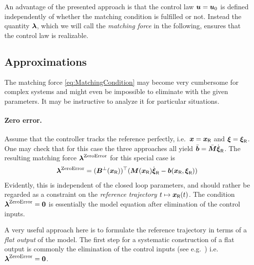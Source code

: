 An advantage of the presented approach is that the control law $\boldsymbol{u} = \boldsymbol{u}_0$ is defined independently of whether the matching condition is fulfilled or not.
Instead the quantity $\boldsymbol{\lambda}$, which we will call the \textit{matching force} in the following, ensures that the control law is realizable.

\subsection{Approximations}
The matching force \eqref{eq:MatchingCondition} may become very cumbersome for complex systems and might even be impossible to eliminate with the given parameters.
It may be instructive to analyze it for particular situations.

\paragraph{Zero error.}
Assume that the controller tracks the reference perfectly, i.e.\ $\boldsymbol{x} = \boldsymbol{x}_{\mathsf{R}}$ and $\boldsymbol{\xi}=\boldsymbol{\xi}_{\mathsf{R}}$.
One may check that for this case the three approaches all yield $\bar{\boldsymbol{b}} = \bar{\boldsymbol{M}}\dot{\boldsymbol{\xi}}_{\mathsf{R}}$.
The resulting matching force $\boldsymbol{\lambda}^{\text{ZeroError}}$ for this special case is
\begin{align}\label{eq:MatchingForceZeroError}
 \boldsymbol{\lambda}^{\text{ZeroError}} = (\boldsymbol{B}^\bot(\boldsymbol{x}_{\mathsf{R}}))^\top (\boldsymbol{M}(\boldsymbol{x}_{\mathsf{R}}) \dot{\boldsymbol{\xi}}_{\mathsf{R}} - \boldsymbol{b}(\boldsymbol{x}_{\mathsf{R}}, \boldsymbol{\xi}_{\mathsf{R}}))
\end{align}
Evidently, this is independent of the closed loop parameters, and should rather be regarded as a constraint on the \textit{reference trajectory} $t\mapsto \boldsymbol{x}_{\mathsf{R}}(t)$.
The condition $\boldsymbol{\lambda}^{\text{ZeroError}}=\boldsymbol{0}$ is essentially the model equation after elimination of the control inputs.

A very useful approach here is to formulate the reference trajectory in terms of a \textit{flat output} \cite{Fliess:Flatness} of the model.
The first step for a systematic construction of a flat output is commonly the elimination of the control inputs (see e.g.\ \cite{Schlacher:ConstructionOfFlatOutputs}) i.e.\ $\boldsymbol{\lambda}^{\text{ZeroError}}=\boldsymbol{0}$.

